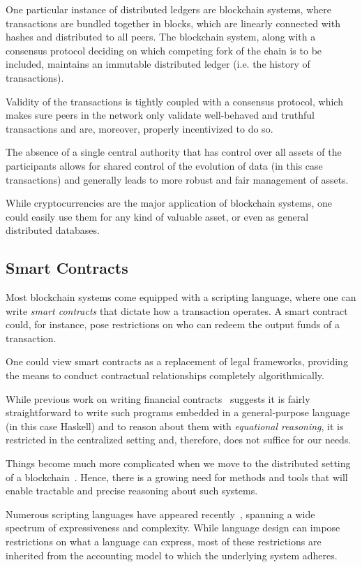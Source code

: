 \documentclass[acmsmall,nonacm=true,screen=true]{acmart}
\begin{document}
One particular instance of distributed ledgers are blockchain systems, where transactions are
bundled together in blocks, which are linearly connected with hashes and distributed to all peers.
The blockchain system, along with a consensus protocol deciding on which competing fork of the chain is to be included,
maintains an immutable distributed ledger (i.e. the history of transactions).

Validity of the transactions is tightly coupled with a consensus protocol, which makes sure
peers in the network only validate well-behaved and truthful transactions and are, moreover,
properly incentivized to do so.

The absence of a single central authority that has control over all assets of the participants allows
for shared control of the evolution of data (in this case transactions)
and generally leads to more robust and fair management of assets.

While cryptocurrencies are the major application of blockchain systems, one could easily
use them for any kind of valuable asset, or even as general distributed databases.

\subsection{Smart Contracts} \label{subsec:smartcontracts}
Most blockchain systems come equipped with a scripting language, where one can write
\textit{smart contracts} that dictate how a transaction operates. A smart contract
could, for instance, pose restrictions on who can redeem the output funds of a transaction.

One could view smart contracts as a replacement of legal frameworks, providing the means
to conduct contractual relationships completely algorithmically.

While previous work on writing financial contracts~\cite{spj} suggests it
is fairly straightforward to write such programs embedded in a general-purpose
language (in this case Haskell) and to reason about them with \textit{equational reasoning},
it is restricted in the centralized setting and, therefore, does not suffice for our needs.

Things become much more complicated when we move to the distributed setting of a blockchain~\cite{setzer,short,scilla}.
Hence, there is a growing need for methods and tools that will
enable tractable and precise reasoning about such systems.

Numerous scripting languages have appeared recently~\cite{scriptlangs}, spanning a wide
spectrum of expressiveness and complexity. While language design can impose restrictions
on what a language can express, most of these restrictions are inherited from
the accounting model to which the underlying system adheres.
\end{document}
